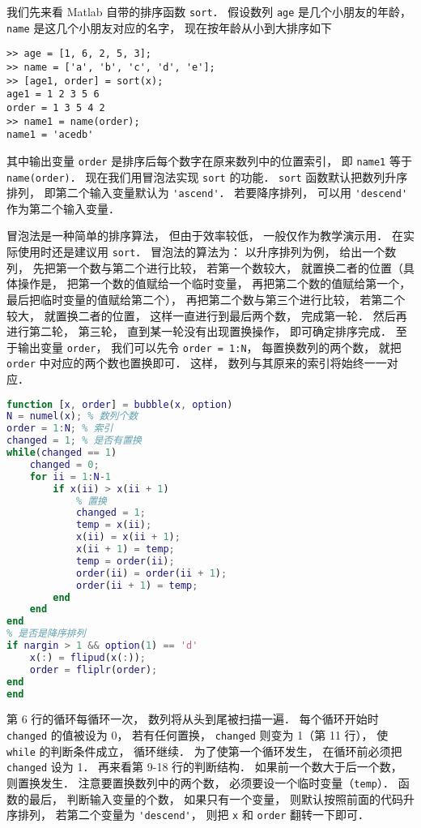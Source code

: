 
我们先来看 Matlab 自带的排序函数 \verb|sort|． 假设数列 \verb|age| 是几个小朋友的年龄， \verb|name| 是这几个小朋友对应的名字， 现在按年龄从小到大排序如下
\begin{lstlisting}[language=matlabC]
>> age = [1, 6, 2, 5, 3];
>> name = ['a', 'b', 'c', 'd', 'e'];
>> [age1, order] = sort(x);
age1 = 1 2 3 5 6
order = 1 3 5 4 2
>> name1 = name(order);
name1 = 'acedb'
\end{lstlisting}
其中输出变量 \verb|order| 是排序后每个数字在原来数列中的位置索引， 即 \verb|name1| 等于 \verb|name(order)|． 现在我们用冒泡法实现 \verb|sort| 的功能． \verb|sort| 函数默认把数列升序排列， 即第二个输入变量默认为 \verb|'ascend'|． 若要降序排列， 可以用 \verb|'descend'| 作为第二个输入变量．

冒泡法是一种简单的排序算法， 但由于效率较低， 一般仅作为教学演示用． 在实际使用时还是建议用 \verb|sort|． 冒泡法的算法为： 以升序排列为例， 给出一个数列， 先把第一个数与第二个进行比较， 若第一个数较大， 就置换二者的位置（具体操作是， 把第一个数的值赋给一个临时变量， 再把第二个数的值赋给第一个， 最后把临时变量的值赋给第二个）， 再把第二个数与第三个进行比较， 若第二个较大， 就置换二者的位置， 这样一直进行到最后两个数， 完成第一轮． 然后再进行第二轮， 第三轮， 直到某一轮没有出现置换操作， 即可确定排序完成． 至于输出变量 \verb|order|， 我们可以先令 \verb|order = 1:N|， 每置换数列的两个数， 就把 \verb|order| 中对应的两个数也置换即可． 这样， 数列与其原来的索引将始终一一对应． 

\begin{lstlisting}[language=matlab, caption=bubble.m]
% 冒泡法排序
function [x, order] = bubble(x, option)
N = numel(x); % 数列个数
order = 1:N; % 索引
changed = 1; % 是否有置换
while(changed == 1)
    changed = 0;
    for ii = 1:N-1
        if x(ii) > x(ii + 1)
            % 置换
            changed = 1;
            temp = x(ii);
            x(ii) = x(ii + 1);
            x(ii + 1) = temp;
            temp = order(ii);
            order(ii) = order(ii + 1);
            order(ii + 1) = temp;
        end
    end
end
% 是否是降序排列
if nargin > 1 && option(1) == 'd'
    x(:) = flipud(x(:));
    order = fliplr(order);
end
end
\end{lstlisting}

第 6 行的循环每循环一次， 数列将从头到尾被扫描一遍． 每个循环开始时 \verb|changed| 的值被设为 0， 若有任何置换， \verb|changed| 则变为 1（第 11 行）， 使 \verb|while| 的判断条件成立， 循环继续． 为了使第一个循环发生， 在循环前必须把 \verb|changed| 设为 1． 再来看第 9-18 行的判断结构． 如果前一个数大于后一个数， 则置换发生． 注意要置换数列中的两个数， 必须要设一个临时变量（\verb|temp|）． 函数的最后， 判断输入变量的个数， 如果只有一个变量， 则默认按照前面的代码升序排列， 若第二个变量为 \verb|'descend'|， 则把 \verb|x| 和 \verb|order| 翻转一下即可．
